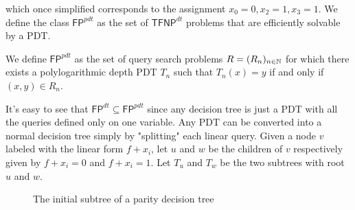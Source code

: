 which once simplified corresponds to the assignment $x_0 = 0, x_2 = 1, x_3 = 1$. We define the class $\mathsf{FP}^{pdt}$ as the set of $\mathsf{TFNP}^{dt}$ problems that are efficiently solvable by a PDT.

\begin{definition}
    We define $\mathsf{FP}^{pdt}$ as the set of query search problems $R = (R_n)_{n \in \mathbb{N}}$ for which there exists a polylogarithmic depth PDT $T_n$ such that $T_n(x) = y$ if and only if $(x,y) \in R_n$.
\end{definition}

It's easy to see that $\mathsf{FP}^{dt} \subseteq \mathsf{FP}^{pdt}$ since any decision tree is just a PDT with all the queries defined only on one variable. Any PDT can be converted into a normal decision tree simply by "splitting" each linear query. Given a node $v$ labeled with the linear form $f + x_i$, let $u$ and $w$ be the children of $v$ respectively given by $f + x_i = 0$ and $f+x_i = 1$. Let $T_u$ and $T_w$ be the two subtrees with root $u$ and $w$.

\newpage

\begin{figure}[H]
    \centering


    \caption{The initial subtree of a parity decision tree}
\end{figure}

